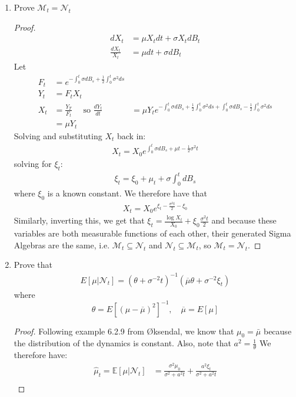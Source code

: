 \documentclass[11pt]{article}
\newcommand{\ncal}{\mathcal{N}}
\newcommand{\mcal}{\mathcal{M}}
\newcommand{\gt}{\theta}
\newcommand{\gs}{\sigma}
\newcommand{\E}{\mathbb{E}}
\begin{document}
\begin{enumerate}
\item Prove $\mcal_t = \ncal_t$
\begin{proof}
\begin{align*}
dX_t &= \mu X_t dt + \gs X_t dB_t\\
\frac{dX_t}{X_t} &= \mu dt + \gs dB_t
\end{align*}
Let
\begin{align*}
F_t&=e^{-\int_0^t \gs dB_s + \frac{1}{2} \int_0^t \gs^2 ds}\\
Y_t&=F_t X_t \\
X_t & = \frac{Y_T}{F_t} \quad \text{ so }
\frac{dY_t}{dt}&=\mu Y_t e^{-\int_0^t \gs dB_s + \frac{1}{2} \int_0^t \gs^2 ds +\int_0^t \gs dB_s - \frac{1}{2} \int_0^t \gs^2 ds} \\
&= \mu Y_t
\end{align*}
Solving and substituting $X_t$ back in:
\begin{align*}
X_t = X_0 e^{\int_0^t \gs dB_s + \mu t - \frac{1}{2} \gs^2 t}
\end{align*}
solving for $\xi_t$: 
\begin{align*}
\xi_t = \xi_0 + \mu_t + \gs \int_0^t dB_s
\end{align*}
where $\xi_0$ is a known constant.  We therefore have that
\begin{align*}
X_t = X_0 e^{\xi_t - \frac{\gs^2t}{2}-\xi_0}
\end{align*}
Similarly, inverting this, we get that $\xi_t = \frac{\log X_t}{X_0} + \xi_0 \frac{\gs^2 t}{2}$ and because these variables are both measurable functions of each other, their generated Sigma Algebras are the same, i.e. $\mcal_t \subseteq \ncal_t$ and $\ncal_t \subseteq \mcal_t$, so $\mcal_t = \ncal_t$.
\end{proof}
\item Prove that 
\begin{align*}
E [ \mu | \mathcal { N } _ { t } ] = \left( \theta + \sigma ^ { - 2 } t \right) ^ { - 1 } \left( \overline { \mu } \theta + \sigma ^ { - 2 } \xi _ { t } \right)
\end{align*} where
$$\theta = E \left[ ( \mu - \overline { \mu } ) ^ { 2 } \right] ^ { - 1 } , \quad \overline { \mu } = E [ \mu ]$$
\begin{proof}
Following example 6.2.9 from \O ksendal, we know that $\mu_0=\bar{\mu}$ because the distribution of the dynamics is constant.  Also, note that $a^2 = \frac{1}{\gt}$  We therefore have: 
\begin{align*}
\hat{\mu}_t = \E[ \mu| \ncal_t] &= \frac{\gs^2 \mu_0}{\gs^2 +a^2 t} + \frac{a^2 \xi_t}{\gs^2 + a^2 t}\\

\end{align*}
\end{proof}
\end{enumerate}
\end{document}
